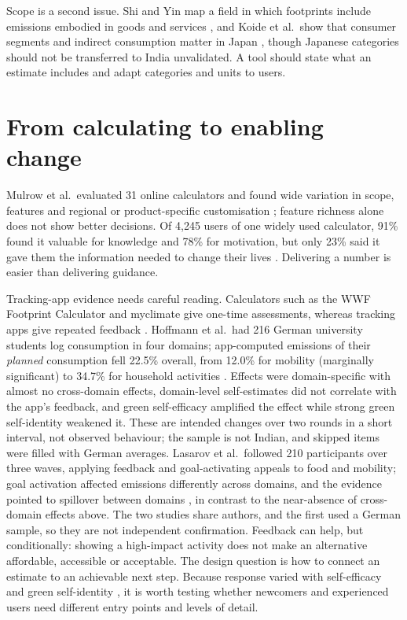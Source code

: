 \documentclass[10pt,a4paper,twocolumn]{article}
\begin{document}
Scope is a second issue. Shi and Yin map a field in which footprints include emissions embodied in goods and services \cite{shi2021}, and Koide et al.\ show that consumer segments and indirect consumption matter in Japan \cite{koide2019}, though Japanese categories should not be transferred to India unvalidated. A tool should state what an estimate includes and adapt categories and units to users.

\section{From calculating to enabling change}
Mulrow et al.\ evaluated 31 online calculators and found wide variation in scope, features and regional or product-specific customisation \cite{mulrow2019}; feature richness alone does not show better decisions. Of 4,245 users of one widely used calculator, 91\% found it valuable for knowledge and 78\% for motivation, but only 23\% said it gave them the information needed to change their lives \cite{collins2020}. Delivering a number is easier than delivering guidance.

Tracking-app evidence needs careful reading. Calculators such as the WWF Footprint Calculator and myclimate give one-time assessments, whereas tracking apps give repeated feedback \cite{hoffmann2024}. Hoffmann et al.\ had 216 German university students log consumption in four domains; app-computed emissions of their \emph{planned} consumption fell 22.5\% overall, from 12.0\% for mobility (marginally significant) to 34.7\% for household activities \cite{hoffmann2024}. Effects were domain-specific with almost no cross-domain effects, domain-level self-estimates did not correlate with the app's feedback, and green self-efficacy amplified the effect while strong green self-identity weakened it. These are intended changes over two rounds in a short interval, not observed behaviour; the sample is not Indian, and skipped items were filled with German averages. Lasarov et al.\ followed 210 participants over three waves, applying feedback and goal-activating appeals to food and mobility; goal activation affected emissions differently across domains, and the evidence pointed to spillover between domains \cite{lasarov2024}, in contrast to the near-absence of cross-domain effects above. The two studies share authors, and the first used a German sample, so they are not independent confirmation. Feedback can help, but conditionally: showing a high-impact activity does not make an alternative affordable, accessible or acceptable. The design question is how to connect an estimate to an achievable next step. Because response varied with self-efficacy and green self-identity \cite{hoffmann2024}, it is worth testing whether newcomers and experienced users need different entry points and levels of detail.
\end{document}
